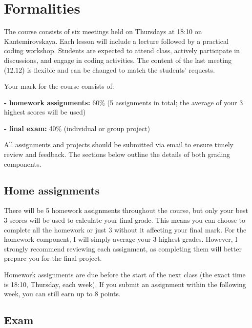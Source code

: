 \documentclass[
]{book}
\begin{document}
\chapter*{\texorpdfstring{\textbf{Formalities}}{Formalities}}\label{formalities}

The course consists of six meetings held on Thursdays at 18:10 on Kantemirovskaya. Each lesson will include a lecture followed by a practical coding workshop. Students are expected to attend class, actively participate in discussions, and engage in coding activities. The content of the last meeting (12.12) is flexible and can be changed to match the students' requests.

Your mark for the course consists of:

\textbf{- homework assignments: }60\% (5 assignments in total; the average of your 3 highest scores will be used)

\textbf{- final exam:} 40\% (individual or group project)

All assignments and projects should be submitted via email to ensure timely review and feedback. The sections below outline the details of both grading components.

\section*{\texorpdfstring{\textbf{Home assignments}}{Home assignments}}\label{home-assignments}

There will be 5 homework assignments throughout the course, but only your best 3 scores will be used to calculate your final grade. This means you can choose to complete all the homework or just 3 without it affecting your final mark. For the homework component, I will simply average your 3 highest grades. However, I strongly recommend reviewing each assignment, as completing them will better prepare you for the final project.

Homework assignments are due before the start of the next class (the exact time is 18:10, Thursday, each week). If you submit an assignment within the following week, you can still earn up to 8 points.

\section*{\texorpdfstring{\textbf{Exam}}{Exam}}\label{exam}
\end{document}
